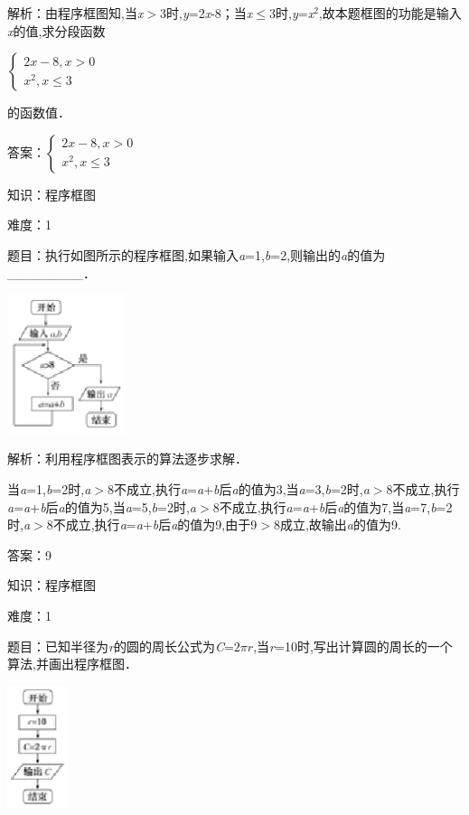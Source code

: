 \documentclass{article} %
\begin{document}
解析：由程序框图知,当\textit{x}$\mathrm{>}$3时,\textit{y}=2\textit{x}-8；当\textit{x}$\mathrm{\le}$3时,\textit{y}=\textit{x}${}^{2}$,故本题框图的功能是输入\textit{x}的值,求分段函数

$\left\{\begin{array}{l}
2x-8,x>0\\
x^2,x\le3
\end{array}\right.$

的函数值．

答案：$\left\{\begin{array}{l}
2x-8,x>0\\
x^2,x\le3
\end{array}\right.$

知识：程序框图

难度：1

题目：执行如图所示的程序框图,如果输入\textit{a}=1,\textit{b}=2,则输出的\textit{a}的值为\_\_\_\_\_\_\_\_．

\includegraphics*[width=1.38in, height=1.60in, keepaspectratio=false]{image8}

解析：利用程序框图表示的算法逐步求解．

当\textit{a}=1,\textit{b}=2时,\textit{a}$\mathrm{>}$8不成立,执行\textit{a}=\textit{a}+\textit{b}后\textit{a}的值为3,当\textit{a}=3,\textit{b}=2时,\textit{a}$\mathrm{>}$8不成立,执行\textit{a}=\textit{a}+\textit{b}后\textit{a}的值为5,当\textit{a}=5,\textit{b}=2时,\textit{a}$\mathrm{>}$8不成立,执行\textit{a}=\textit{a}+\textit{b}后\textit{a}的值为7,当\textit{a}=7,\textit{b}=2时,\textit{a}$\mathrm{>}$8不成立,执行\textit{a}=\textit{a}+\textit{b}后\textit{a}的值为9,由于9$\mathrm{>}$8成立,故输出\textit{a}的值为9.

答案：9



知识：程序框图

难度：1

题目：已知半径为\textit{r}的圆的周长公式为\textit{C}=$2\pi r$,当\textit{r}=10时,写出计算圆的周长的一个算法,并画出程序框图．

\includegraphics*[width=0.71in, height=1.41in, keepaspectratio=false]{image9}
\end{document}
